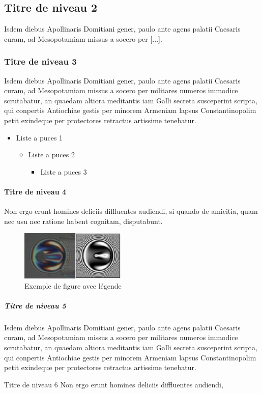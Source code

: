 \subsection{Titre de niveau 2}

Isdem diebus Apollinaris Domitiani gener, paulo ante agens palatii Caesaris curam, ad Mesopotamiam missus a socero per [...].

\subsubsection{Titre de niveau 3}
Isdem diebus Apollinaris Domitiani gener, paulo ante agens palatii Caesaris curam, ad Mesopotamiam missus a socero per militares numeros immodice scrutabatur, an quaedam altiora meditantis iam Galli secreta susceperint scripta, qui conpertis Antiochiae gestis per minorem Armeniam lapsus Constantinopolim petit exindeque per protectores retractus artissime tenebatur.

\begin{itemize}
\item Liste a puces 1
			\begin{itemize}
			\item Liste a puces 2
						\begin{itemize}
						\item Liste a puces 3
						\end{itemize}
			\end{itemize}
\end{itemize} 

\paragraph{Titre de niveau 4}
Non ergo erunt homines deliciis diffluentes audiendi, si quando de amicitia, quam nec usu nec ratione habent cognitam, disputabunt.

\begin{figure}[H]
	\center
	\includegraphics[width=5cm]{body/images/figure_example.png} 
	\caption{Exemple de figure avec légende}
	\label{fig:exemple}
\end{figure}

\subparagraph{Titre de niveau 5}

Isdem diebus Apollinaris Domitiani gener, paulo ante agens palatii Caesaris curam, ad Mesopotamiam missus a socero per militares numeros immodice scrutabatur, an quaedam altiora meditantis iam Galli secreta susceperint scripta, qui conpertis Antiochiae gestis per minorem Armeniam lapsus Constantinopolim petit exindeque per protectores retractus artissime tenebatur.

Titre de niveau 6
Non ergo erunt homines deliciis diffluentes audiendi,
